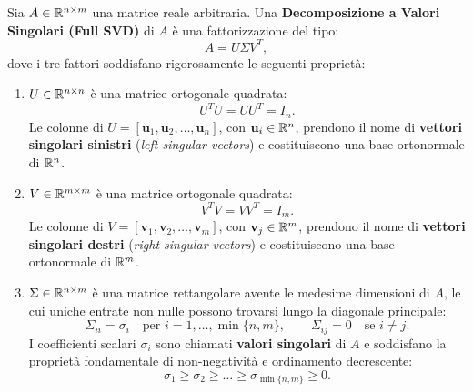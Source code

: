 \begin{definition}
\label{def:full-svd}
Sia $A \in \mathbb{R}^{n \times m}$ una matrice reale arbitraria. Una \textbf{Decomposizione a Valori Singolari (Full SVD)} di $A$ \`e una fattorizzazione del tipo:
\begin{equation}
    A = U \Sigma V^T,
\end{equation}
dove i tre fattori soddisfano rigorosamente le seguenti propriet\`a:
\begin{enumerate}
    \item $U \in \mathbb{R}^{n \times n}$ \`e una matrice ortogonale quadrata:
    \begin{equation}
        U^T U = U U^T = I_n.
    \end{equation}
    Le colonne di $U = [\mathbf{u}_1, \mathbf{u}_2, \dots, \mathbf{u}_n]$, con $\mathbf{u}_i \in \mathbb{R}^n$, prendono il nome di \textbf{vettori singolari sinistri} (\textit{left singular vectors}) e costituiscono una base ortonormale di $\mathbb{R}^n$.

    \item $V \in \mathbb{R}^{m \times m}$ \`e una matrice ortogonale quadrata:
    \begin{equation}
        V^T V = V V^T = I_m.
    \end{equation}
    Le colonne di $V = [\mathbf{v}_1, \mathbf{v}_2, \dots, \mathbf{v}_m]$, con $\mathbf{v}_j \in \mathbb{R}^m$, prendono il nome di \textbf{vettori singolari destri} (\textit{right singular vectors}) e costituiscono una base ortonormale di $\mathbb{R}^m$.

    \item $\Sigma \in \mathbb{R}^{n \times m}$ \`e una matrice rettangolare avente le medesime dimensioni di $A$, le cui uniche entrate non nulle possono trovarsi lungo la diagonale principale:
    \begin{equation}
        \Sigma_{ii} = \sigma_i \quad \text{per } i = 1, \dots, \min\{n, m\}, \qquad \Sigma_{ij} = 0 \quad \text{se } i \neq j.
    \end{equation}
    I coefficienti scalari $\sigma_i$ sono chiamati \textbf{valori singolari} di $A$ e soddisfano la propriet\`a fondamentale di non-negativit\`a e ordinamento decrescente:
    \begin{equation}
        \sigma_1 \ge \sigma_2 \ge \dots \ge \sigma_{\min\{n, m\}} \ge 0.
    \end{equation}
\end{enumerate}
\end{definition}

